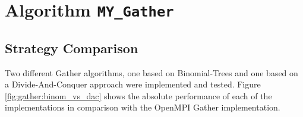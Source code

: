 
\newcommand\mygather{\texttt{MY\_Gather}\xspace}
\newcommand\myscatter{\texttt{MY\_Scatter}\xspace}

\newcommand\mpigather{\texttt{MPI\_Gather}\xspace}
\newcommand\mpiscatter{\texttt{MPI\_Scatter}\xspace}

\section{Algorithm \mygather}

\subsection{Strategy Comparison}

Two different Gather algorithms, one based on Binomial-Trees and one based on a Divide-And-Conquer approach were implemented and tested. Figure \ref{fig:gather:binom_vs_dac} shows the absolute performance of each of the implementations in comparison with the OpenMPI Gather implementation.

